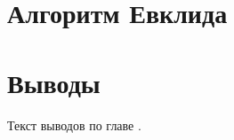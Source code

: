\section{Алгоритм Евклида}

\section{Выводы} \label{ch4:conclusion}
Текст выводов по главе \thechapter.

%
